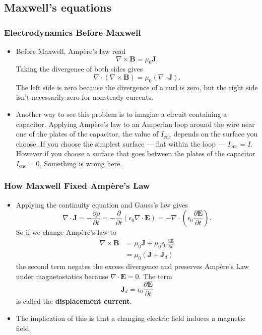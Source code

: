 \documentclass{article}
\renewcommand{\vec}[1]{\boldsymbol{\mathbf{#1}}}
\begin{document}
\subsection{Maxwell's equations}

\subsubsection{Electrodynamics Before Maxwell}

\begin{itemize}
  \item Before Maxwell, Ampère's law read \[\nabla \times \vec{B} = \mu_0 \vec{J}.\] Taking the divergence of both sides gives \[\nabla \cdot (\nabla \times \vec{B}) = \mu_0 (\nabla \cdot \vec{J}).\] The left side is zero because the divergence of a curl is zero, but the right side isn't necessarily zero for nonsteady currents.

  \item Another way to see this problem is to imagine a circuit containing a capacitor. Applying Ampère's law to an Amperian loop around the wire near one of the plates of the capacitor, the value of $I_\text{enc}$ depends on the surface you choose. If you choose the simplest surface — flat within the loop — $I_\text{enc} = I$. However if you choose a surface that goes between the plates of the capacitor $I_\text{enc} = 0$. Something is wrong here.
\end{itemize}

\subsubsection{How Maxwell Fixed Ampère's Law}

\begin{itemize}
  \item Applying the continuity equation and Gauss's law gives \[\nabla \cdot \vec{J} = -\frac{\partial \rho}{\partial t} = -\frac{\partial}{\partial t} (\epsilon_0 \nabla \cdot \vec{E}) = -\nabla \cdot \left( \epsilon_0 \frac{\partial \vec{E}}{\partial t} \right).\] So if we change Ampère's law to \begin{align*}
          \nabla \times \vec{B} & = \mu_0 \vec{J} + \mu_0 \epsilon_0 \frac{\partial \vec{E}}{\partial t} \\
                                & = \mu_0 (\vec{J} + \vec{J}_d)
        \end{align*} the second term negates the excess divergence and preserves Ampère's Law under magnetostatics because $\nabla \cdot \vec{E} = 0$. The term \[\vec{J}_d = \epsilon_0 \frac{\partial \vec{E}}{\partial t}\] is called the \textbf{displacement current}.

  \item The implication of this is that a changing electric field induces a magnetic field.
\end{itemize}
\end{document}
